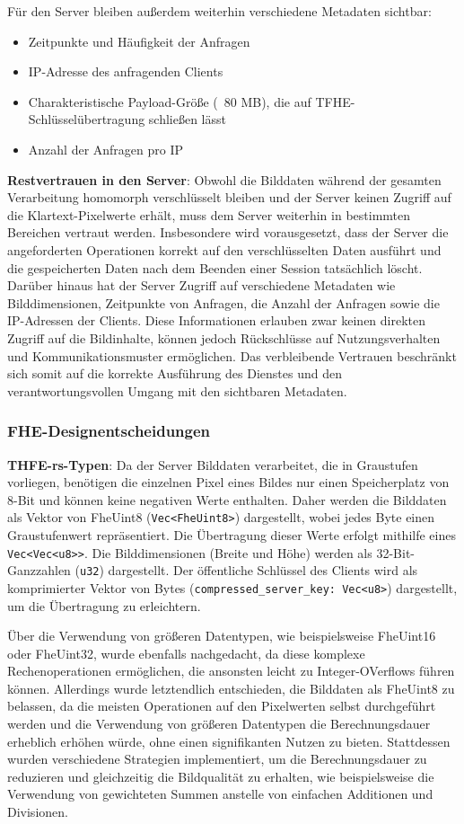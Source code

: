 Für den Server bleiben außerdem weiterhin verschiedene Metadaten sichtbar:
\begin{itemize}
    \item Zeitpunkte und Häufigkeit der Anfragen
    \item IP-Adresse des anfragenden Clients
    \item Charakteristische Payload-Größe (~80 MB), die auf TFHE-Schlüsselübertragung schließen lässt
    \item Anzahl der Anfragen pro IP
\end{itemize}

\textbf{Restvertrauen in den Server}:
Obwohl die Bilddaten während der gesamten Verarbeitung homomorph verschlüsselt bleiben und der Server keinen Zugriff auf die Klartext-Pixelwerte erhält, muss dem Server weiterhin in bestimmten Bereichen vertraut werden. Insbesondere wird vorausgesetzt, dass der Server die angeforderten Operationen korrekt auf den verschlüsselten Daten ausführt und die gespeicherten Daten nach dem Beenden einer Session tatsächlich löscht. Darüber hinaus hat der Server Zugriff auf verschiedene Metadaten wie Bilddimensionen, Zeitpunkte von Anfragen, die Anzahl der Anfragen sowie die IP-Adressen der Clients. Diese Informationen erlauben zwar keinen direkten Zugriff auf die Bildinhalte, können jedoch Rückschlüsse auf Nutzungsverhalten und Kommunikationsmuster ermöglichen. Das verbleibende Vertrauen beschränkt sich somit auf die korrekte Ausführung des Dienstes und den verantwortungsvollen Umgang mit den sichtbaren Metadaten.

\subsubsection{FHE-Designentscheidungen}
\textbf{THFE-rs-Typen}:
Da der Server Bilddaten verarbeitet, die in Graustufen vorliegen, benötigen die einzelnen Pixel eines Bildes nur einen Speicherplatz von 8-Bit und können keine negativen Werte enthalten. Daher werden die Bilddaten als Vektor von FheUint8 (\verb|Vec<FheUint8>|) dargestellt, wobei jedes Byte einen Graustufenwert repräsentiert. Die Übertragung dieser Werte erfolgt mithilfe eines \verb|Vec<Vec<u8>>|. Die Bilddimensionen (Breite und Höhe) werden als 32-Bit-Ganzzahlen (\verb|u32|) dargestellt. Der öffentliche Schlüssel des Clients wird als komprimierter Vektor von Bytes (\verb|compressed_server_key: Vec<u8>|) dargestellt, um die Übertragung zu erleichtern.

Über die Verwendung von größeren Datentypen, wie beispielsweise FheUint16 oder FheUint32, wurde ebenfalls nachgedacht, da diese komplexe Rechenoperationen ermöglichen, die ansonsten leicht zu Integer-OVerflows führen können. Allerdings wurde letztendlich entschieden, die Bilddaten als FheUint8 zu belassen, da die meisten Operationen auf den Pixelwerten selbst durchgeführt werden und die Verwendung von größeren Datentypen die Berechnungsdauer erheblich erhöhen würde, ohne einen signifikanten Nutzen zu bieten. Stattdessen wurden verschiedene Strategien implementiert, um die Berechnungsdauer zu reduzieren und gleichzeitig die Bildqualität zu erhalten, wie beispielsweise die Verwendung von gewichteten Summen anstelle von einfachen Additionen und Divisionen.

